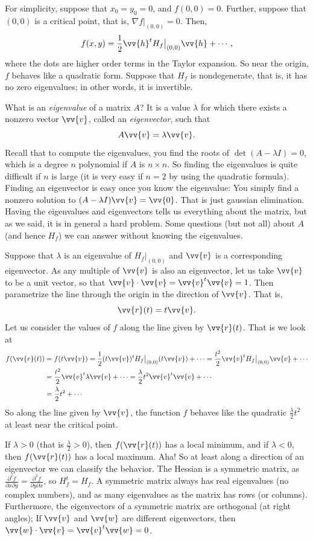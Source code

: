 \documentclass[12pt]{article}
\begin{document}
For simplicity, suppose that $x_0 = y_0 = 0$, and $f(0,0) = 0$.
Further, suppose that $(0,0)$ is a critical point, that is,
$\nabla f|_{(0,0)} = 0$.  Then,
\[
f(x,y) = \frac{1}{2} \vv{h}^{t} H_f\big|_{(0,0)} \vv{h}
+
\cdots ,
\]
where the dots are higher order terms in the Taylor expansion.
So near the origin, $f$ behaves like a quadratic form.
Suppose that $H_f$ is nondegenerate, that is, it has
no zero eigenvalues; in other words, it is invertible.

What is an \emph{eigenvalue} of a matrix $A$?
It is a value $\lambda$ for which there exists
a nonzero vector $\vv{v}$, called an \emph{eigenvector}, such that
\[
A \vv{v} = \lambda \vv{v} .
\]
Recall that to compute the eigenvalues, you find the roots of $\det(A-\lambda I)
= 0$, which is a degree $n$ polynomial if $A$ is $n \times n$.  So finding
the eigenvalues is quite difficult if $n$ is large (it is very easy if $n=2$ by
using the quadratic formula).  Finding an eigenvector is easy once you know
the eigenvalue: You simply find a nonzero solution to $(A-\lambda I) \vv{v}
= \vv{0}$.  That is just gaussian elimination.  Having the eigenvalues
and eigenvectors tells us everything about the matrix, but as we said,
it is in general a hard problem.  Some questions (but not all)
about $A$ (and hence $H_f$) we can answer without knowing the eigenvalues.

Suppose that $\lambda$ is an eigenvalue of $H_f\big|_{(0,0)}$ and $\vv{v}$ is a
corresponding eigenvector.  As any multiple of $\vv{v}$ is also an
eigenvector, let us take $\vv{v}$ to be a unit vector,
so that $\vv{v} \cdot \vv{v} = \vv{v}^t \vv{v} = 1$.
Then parametrize the line through the origin in the direction
of $\vv{v}$.  That is,
\[
\vv{r}(t) = t\vv{v} .
\]
Let us consider the values of $f$ along the line given by
$\vv{r}(t)$.  That is we look at
\[
\begin{split}
f(\vv{r}(t)) & = 
f(t \vv{v}) = 
\frac{1}{2} (t \vv{v})^{t} H_f\big|_{(0,0)} (t \vv{v})
+
\cdots 
=
\frac{t^2}{2} \vv{v}^{t} H_f\big|_{(0,0)} \vv{v}
+
\cdots 
\\
& =
\frac{t^2}{2} \vv{v}^{t} \lambda \vv{v}
+
\cdots 
=
\frac{\lambda}{2} t^2 \vv{v}^{t} \vv{v}
+
\cdots 
\\
& =
\frac{\lambda}{2} t^2
+
\cdots 
\end{split}
\]
So along the line given by $\vv{v}$, the function $f$ behaves like
the quadratic $\frac{\lambda}{2} t^2$ at least near the critical point.

If $\lambda > 0$ (that is $\frac{\lambda}{2} > 0$), then
$f(\vv{r}(t))$ has a local minimum, and if 
$\lambda < 0$, then
$f(\vv{r}(t))$ has a local maximum.  Aha!  So at least along a direction of
an eigenvector we can classify the behavior.
The Hessian is a
symmetric matrix, as
$\frac{\partial^2 f}{\partial x \partial y} = 
\frac{\partial^2 f}{\partial y \partial x}$, so $H_f^t = H_f$.  A symmetric
matrix always has real eigenvalues (no complex numbers),
and as many eigenvalues as the matrix has rows (or columns).
Furthermore,
the eigenvectors of a symmetric matrix are orthogonal (at right angles);
If $\vv{v}$ and
$\vv{w}$ are different eigenvectors, then
$\vv{w} \cdot \vv{v} = \vv{v}^t \vv{w} = 0$.
\end{document}
